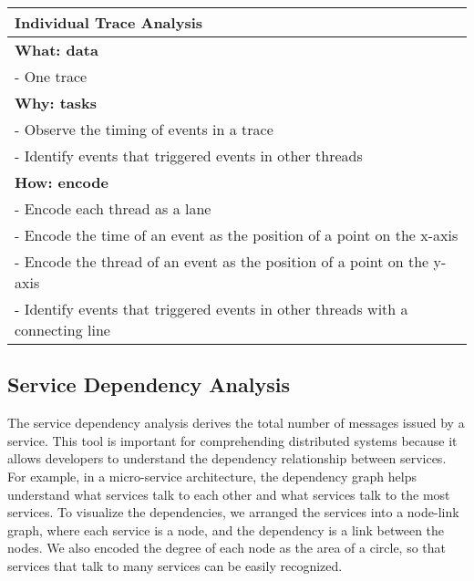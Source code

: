 \begin{center}
    \begin{tabular}{|p{}|}
        \hline
        \textbf{Individual Trace Analysis}                                              \\
        \hline
        \textbf{What: data}                                                             \\
        - One trace                                                                     \\
        \hline
        \textbf{Why: tasks}                                                             \\
        - Observe the timing of events in a trace                                       \\
        - Identify events that triggered events in other threads                        \\
        \hline
        \textbf{How: encode}                                                            \\
        - Encode each thread as a lane                                                  \\
        - Encode the time of an event as the position of a point on the x-axis          \\
        - Encode the thread of an event as the position of a point on the y-axis        \\
        - Identify events that triggered events in other threads with a connecting line \\
        \hline
    \end{tabular}
\end{center}


\subsection{Service Dependency Analysis}


The service dependency analysis derives the total number of messages issued by a service.
This tool is important for comprehending distributed systems because it allows developers to understand the
dependency relationship between services. For example, in a micro-service architecture, the dependency graph helps understand what services
talk to each other and what services talk to the most services. To visualize the dependencies, we arranged the services into
a node-link graph, where each service is a node, and the dependency is a link between the nodes. We also encoded the degree of each node as the area of
a circle, so that services that talk to many services can be easily recognized.

